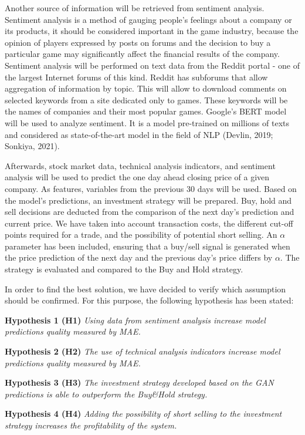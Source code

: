 \documentclass[review]{elsarticle} %
\begin{document}
Another source of information will be retrieved from sentiment analysis. Sentiment analysis is a method of gauging people's feelings about a company or its products, it should be considered important in the game industry, because the opinion of players expressed by posts on forums and the decision to buy a particular game may significantly affect the financial results of the company. Sentiment analysis will be performed on text data from the Reddit portal - one of the largest Internet forums of this kind. Reddit has subforums that allow aggregation of information by topic. This will allow to download comments on selected keywords from a site dedicated only to games. These keywords will be the names of companies and their most popular games. Google's BERT model will be used to analyze sentiment. It is a model pre-trained on millions of texts and considered as state-of-the-art model in the field of NLP (Devlin, 2019; Sonkiya, 2021). 

Afterwards, stock market data, technical analysis indicators, and sentiment analysis will be used to predict the one day ahead closing price of a given company. As features, variables from the previous 30 days will be used. Based on the model's predictions, an investment strategy will be prepared. Buy, hold and sell decisions are deducted from the comparison of the next day's prediction and current price. We have taken into account transaction costs, the different cut-off points required for a trade, and the possibility of potential short selling. An $\alpha$ parameter has been included, ensuring that a buy/sell signal is generated when the price prediction of the next day and the previous day's price differs by $\alpha$. The strategy is evaluated and compared to the Buy and Hold strategy.

In order to find the best solution, we have decided to verify which assumption should be confirmed. For this purpose, the following hypothesis has been stated: 

\textbf{Hypothesis 1 (H1)} \textit{Using data from sentiment analysis increase model predictions quality measured by MAE.}

\textbf{Hypothesis 2 (H2)} \textit{The use of technical analysis indicators increase model predictions quality measured by MAE.}

\textbf{Hypothesis 3 (H3)} \textit{The investment strategy developed based on the GAN predictions is able to outperform the Buy\&Hold strategy.} 

\textbf{Hypothesis 4 (H4)} \textit{Adding the possibility of short selling to the investment strategy increases the profitability of the system.}
\end{document}
